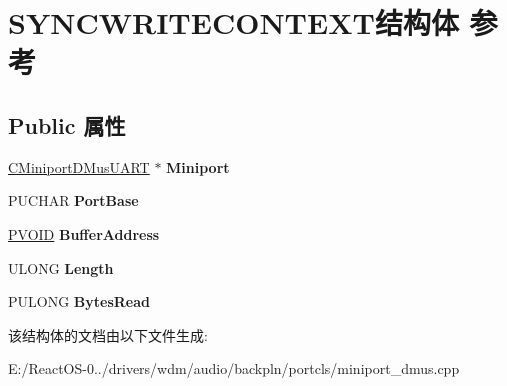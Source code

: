 \hypertarget{struct_s_y_n_c_w_r_i_t_e_c_o_n_t_e_x_t}{}\section{S\+Y\+N\+C\+W\+R\+I\+T\+E\+C\+O\+N\+T\+E\+X\+T结构体 参考}
\label{struct_s_y_n_c_w_r_i_t_e_c_o_n_t_e_x_t}
\subsection*{Public 属性}
\begin{DoxyCompactItemize}
\item 
\mbox{\label{struct_s_y_n_c_w_r_i_t_e_c_o_n_t_e_x_t_aed4f892f3b5eddd76eaae74442cf1b4b}} 
\hyperlink{class_c_miniport_d_mus_u_a_r_t}{C\+Miniport\+D\+Mus\+U\+A\+RT} $\ast$ {\bfseries Miniport}
\item 
\mbox{\label{struct_s_y_n_c_w_r_i_t_e_c_o_n_t_e_x_t_acd97ef9e8a7bd9e507cd351a119235be}} 
P\+U\+C\+H\+AR {\bfseries Port\+Base}
\item 
\mbox{\label{struct_s_y_n_c_w_r_i_t_e_c_o_n_t_e_x_t_a528875069dd72b4722f40c1cc8c2a265}} 
\hyperlink{interfacevoid}{P\+V\+O\+ID} {\bfseries Buffer\+Address}
\item 
\mbox{\label{struct_s_y_n_c_w_r_i_t_e_c_o_n_t_e_x_t_a90982d0f150d1594f1057b4e785cf76d}} 
U\+L\+O\+NG {\bfseries Length}
\item 
\mbox{\label{struct_s_y_n_c_w_r_i_t_e_c_o_n_t_e_x_t_af9498a05fea107826272c17af86e38d8}} 
P\+U\+L\+O\+NG {\bfseries Bytes\+Read}
\end{DoxyCompactItemize}


该结构体的文档由以下文件生成\+:\begin{DoxyCompactItemize}
\item 
E\+:/\+React\+O\+S-\/0../drivers/wdm/audio/backpln/portcls/miniport\+\_\+dmus.\+cpp\end{DoxyCompactItemize}
